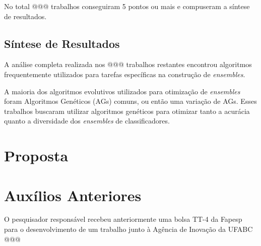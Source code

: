 \documentclass[12pt]{report}
\begin{document}
No total @@@ trabalhos conseguiram 5 pontos ou mais e compuseram a síntese de resultados.

\section{Síntese de Resultados} \label{sec:sintese_de_resultados}

A análise completa realizada nos @@@ trabalhos restantes encontrou algoritmos frequentemente utilizados para tarefas específicas na construção de \textit{ensembles}.

A maioria dos algoritmos evolutivos utilizados para otimização de \textit{ensembles} foram Algoritmos Genéticos (AGs) comuns, ou então uma variação de AGs. Esses trabalhos buscaram utilizar algoritmos genéticos para otimizar tanto a acurácia quanto a diversidade dos \textit{ensembles} de classificadores.





\chapter{Proposta}




\chapter{Auxílios Anteriores}

O pesquisador responsável recebeu anteriormente uma bolsa TT-4 da Fapesp para o desenvolvimento de um trabalho junto à Agência de Inovação da UFABC @@@ 





\end{document}
